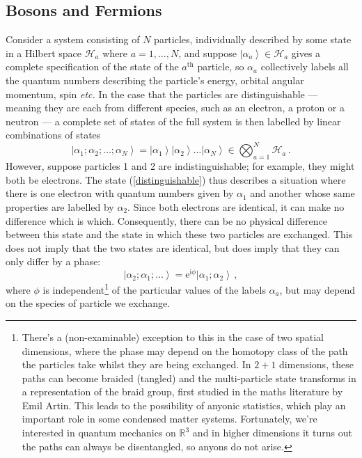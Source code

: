 \documentclass{article}
\theoremstyle{plain}\theoremheaderfont{\normalfont\itshape}\theorembodyfont{\rmfamily}\theoremseparator{.}\newtheorem*{rem}{Remark}\newtheorem*{ex}{Example}\newtheorem*{proof}{Proof}\newtheorem*{altp}{Alternative proof}
\theoremstyle{plain}\theoremheaderfont{\normalfont\bfseries}\theorembodyfont{\rmfamily}\theoremseparator{.}\newtheorem{thm}{Theorem}[section]\newtheorem{lem}[thm]{Lemma}\newtheorem{prop}[thm]{Proposition}\newtheorem*{cor}{Corollary}\newtheorem{defn}[thm]{Definition}\newtheorem{clm}[thm]{Claim}\newtheorem{clminproof}{Claim}
\theoremstyle{break}\theoremheaderfont{\normalfont\itshape}\theorembodyfont{\rmfamily}\theoremseparator{.\medskip}\newtheorem*{proofskip}{Proof}\newtheorem*{exs}{Examples}\newtheorem*{rems}{Remarks}
\theoremstyle{break}\theoremheaderfont{\normalfont\bfseries}\theorembodyfont{\rmfamily}\theoremseparator{.\medskip}\newtheorem{lemskip}[thm]{Lemma}\newtheorem{defnskip}[thm]{Definition}\newtheorem{propskip}[thm]{Proposition}\newtheorem{thmskip}[thm]{Theorem}
\numberwithin{equation}{section}
\newcommand{\ii}{\mathrm{i}}
\newcommand{\ee}{\mathrm{e}}
\newcommand{\ket}[1]{\left| #1 \right\rangle}
\newcommand{\hb}{\mathcal{H}}
\newcommand{\RR}{\mathbb{R}}
\begin{document}
    \subsection{Bosons and Fermions}
    Consider a system consisting of \(N\) particles, individually described by some state in a Hilbert space \(\hb_a\) where \(a = 1,\dots,N\), and suppose \(\ket{\alpha_a}\in\hb_a\) gives a complete specification of the state of the \(a^{\text{th}}\) particle, so \(\alpha_a\) collectively labels all the quantum numbers describing the particle's energy, orbital angular momentum, spin \textit{etc.} In the case that the particles are distinguishable --- meaning they are each from different species, such as an electron, a proton or a neutron --- a complete set of states of the full system is then labelled by linear combinations of states
    \begin{equation}\label{distinguishable}
        \ket{\alpha_1;\alpha_2;\dots;\alpha_N}=\ket{\alpha_1}\ket{\alpha_2}\dots\ket{\alpha_N}\in\bigotimes_{a=1}^{N}\hb_a\,.
    \end{equation}
    However, suppose particles 1 and 2 are indistinguishable; for example, they might both be electrons. The state (\ref{distinguishable}) thus describes a situation where there is one electron with quantum numbers given by \(\alpha_1\) and another whose same properties are labelled by \(\alpha_2\). Since both electrons are identical, it can make no difference which is which. Consequently, there can be no physical difference between this state and the state in which these two particles are exchanged. This does not imply that the two states are identical, but does imply that they can only differ by a phase:
    \begin{equation}
        \ket{\alpha_2;\alpha_1;\dots}=\ee^{\ii \phi}\ket{\alpha_1;\alpha_2}\,,
    \end{equation}
    where \(\phi\) is independent\footnote{There's a (non-examinable) exception to this in the case of two spatial dimensions, where the phase may depend on the homotopy class of the path the particles take whilst they are being exchanged. In \(2+1\) dimensions, these paths can become braided (tangled) and the multi-particle state transforms in a representation of the braid group, first studied in the maths literature by Emil Artin. This leads to the possibility of anyonic statistics, which play an important role in some condensed matter systems. Fortunately, we're interested in quantum mechanics on \(\RR^3\) and in higher dimensions it turns out the paths can always be disentangled, so anyons do not arise.} of the particular values of the labels \(\alpha_a\), but may depend on the species of particle we exchange.
\end{document}
